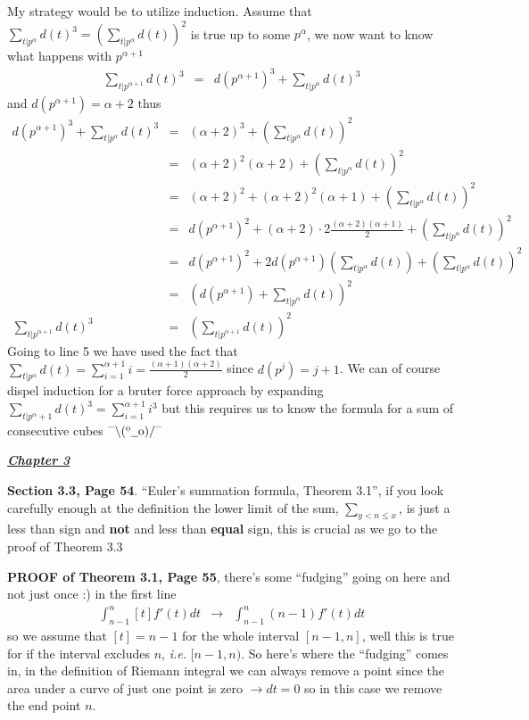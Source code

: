 \documentclass[aps,preprint,preprintnumbers,nofootinbib,showpacs,prd]{revtex4-1}
\newcommand{\ie}{{\it i.e.} }
\newcommand{\nbea}{\begin{eqnarray*}}
\newcommand{\neea}{\end{eqnarray*}}
\newcommand{\dunno}{$ {}^{\mbox {--}}\backslash(^{\rm o}{}\underline{\hspace{0.2cm}}{\rm o})/^{\mbox {--}}$}
\begin{document}
My strategy would be to utilize induction. Assume that $\sum_{t|p^\alpha} d(t)^3 = \left (\sum_{t|p^\alpha} d(t)\right )^2$ is true up to some $p^\alpha$, we now want to know what happens with $p^{\alpha+1}$
%
\nbea
\sum_{t|p^{\alpha+1}} d(t)^3 & = & d(p^{\alpha+1})^3 + \sum_{t|p^\alpha} d(t)^3
\neea
%
and $d(p^{\alpha+1}) = \alpha+2$ thus
%
\nbea
d(p^{\alpha+1})^3 + \sum_{t|p^\alpha} d(t)^3 & = & (\alpha + 2)^3 + \left ( \sum_{t|p^\alpha} d(t)\right )^2 \\
& = & (\alpha + 2)^2(\alpha + 2) + \left ( \sum_{t|p^\alpha} d(t)\right )^2 \\
& = & (\alpha + 2)^2 + (\alpha + 2)^2(\alpha + 1) + \left ( \sum_{t|p^\alpha} d(t)\right )^2 \\
& = & d(p^{\alpha + 1})^2 + (\alpha + 2)\cdot 2 \frac{(\alpha + 2)(\alpha + 1)}{2} + \left ( \sum_{t|p^\alpha} d(t)\right )^2 \\
& = & d(p^{\alpha + 1})^2 + 2 d(p^{\alpha+1})\left (\sum_{t|p^\alpha} d(t) \right ) + \left ( \sum_{t|p^\alpha} d(t)\right )^2 \\
& = & \left ( d(p^{\alpha + 1}) + \sum_{t|p^\alpha} d(t) \right )^2 \\
\sum_{t|p^{\alpha+1}} d(t)^3 & = & \left ( \sum_{t|p^{\alpha+1}} d(t) \right )^2
\neea
%
Going to line 5 we have used the fact that $\sum_{t|p^\alpha} d(t) = \sum_{i=1}^{\alpha+1} i = \frac{(\alpha+1)(\alpha + 2)}{2} $ since $d(p^j) = j+1$. We can of course dispel induction for a bruter force approach by expanding $\sum_{t|p^\alpha+1} d(t)^3 = \sum_{i=1}^{\alpha+1} i^3$ but this requires us to know the formula for a sum of consecutive cubes \dunno

\bigskip
\underline{\textbf{\textit{Chapter 3}}}
\smallskip

{\bf Section 3.3, Page 54}. ``Euler's summation formula, Theorem 3.1'', if you look carefully enough at the definition the lower limit of the sum, $\sum_{y<n\le x}$, is just a less than sign and {\bf not} and less than {\bf equal} sign, this is crucial as we go to the proof of Theorem 3.3

{\bf PROOF of Theorem 3.1, Page 55}, there's some ``fudging'' going on here and not just once :) in the first line
%
\nbea
\int_{n-1}^{n}[t] f'(t)dt & \to & \int_{n-1}^n (n-1)f'(t)dt
\neea
%
so we assume that $[t] = n-1$ for the whole interval $[n-1,n]$, well this is true for if the interval excludes $n$, \ie $[n-1,n)$. So here's where the ``fudging'' comes in, in the definition of Riemann integral we can always remove a point since the area under a curve of just one point is zero $\to dt = 0$ so in this case we remove the end point $n$.
\end{document}
